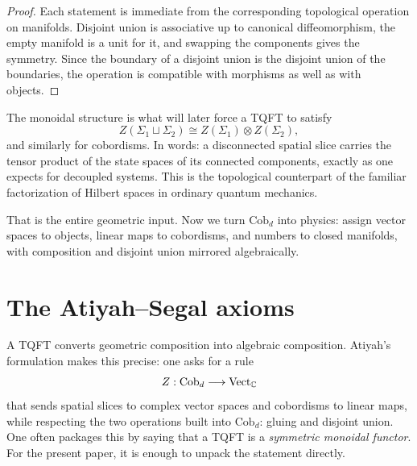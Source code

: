 \begin{proof}
Each statement is immediate from the corresponding topological operation on manifolds. Disjoint union is associative up to canonical diffeomorphism, the empty manifold is a unit for it, and swapping the components gives the symmetry. Since the boundary of a disjoint union is the disjoint union of the boundaries, the operation is compatible with morphisms as well as with objects.
\end{proof}

\begin{remark}\label{rem:disjoint-union-physics}
The monoidal structure is what will later force a TQFT to satisfy
\begin{equation*}
Z(\Sigma_1 \sqcup \Sigma_2) \cong Z(\Sigma_1) \otimes Z(\Sigma_2),
\end{equation*}
and similarly for cobordisms. In words: a disconnected spatial slice carries the tensor product of the state spaces of its connected components, exactly as one expects for decoupled systems. This is the topological counterpart of the familiar factorization of Hilbert spaces in ordinary quantum mechanics.
\end{remark}

\medskip

\noindent That is the entire geometric input.  Now we turn $\mathrm{Cob}_d$ into physics: assign vector spaces to objects, linear maps to cobordisms, and numbers to closed manifolds, with composition and disjoint union mirrored algebraically.

\section{The Atiyah--Segal axioms}\label{sec:atiyah-segal-axioms}

A TQFT converts geometric composition into algebraic composition.  Atiyah's formulation \cite{Atiyah1988TQFT} makes this precise: one asks for a rule
\begin{equation}\label{eq:TQFT-functor}
Z : \mathrm{Cob}_d \longrightarrow \mathrm{Vect}_{\mathbb{C}}
\end{equation}
that sends spatial slices to complex vector spaces and cobordisms to linear maps, while respecting the two operations built into $\mathrm{Cob}_d$: gluing and disjoint union. One often packages this by saying that a TQFT is a \emph{symmetric monoidal functor}. For the present paper, it is enough to unpack the statement directly.

